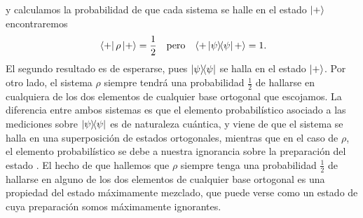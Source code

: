 y calculamos la probabilidad de que cada sistema se halle en el estado $\ket{+}$ encontraremos
\begin{align}
    \bra{+}\rho\ket{+}=\frac{1}{2} && \text{pero} &&\langle + \dyad{\psi} +\rangle=1\rlap{.}\nonumber
\end{align}
El segundo resultado es de esperarse, pues $\dyad{\psi}$ se halla en el estado $\ket{+}$. Por otro lado, el sistema $\rho$ siempre tendrá una probabilidad $\frac{1}{2}$ de hallarse en cualquiera de los dos elementos de cualquier base ortogonal que escojamos. La diferencia entre ambos sistemas es que el elemento probabilístico asociado a las mediciones sobre $\dyad{\psi}$ es de naturaleza cuántica, y viene de que el sistema se halla en una superposición de estados ortogonales, mientras que en el caso de $\rho$, el elemento probabilístico se debe a nuestra ignorancia sobre la preparación del estado \cite{Chuang}. El hecho de que hallemos que $\rho$ siempre tenga una probabilidad $\frac{1}{2}$ de hallarse en alguno de los dos elementos de cualquier base ortogonal es una propiedad del estado máximamente mezclado, que puede verse como un estado de cuya preparación somos máximamente ignorantes.


\iffalse
{}

